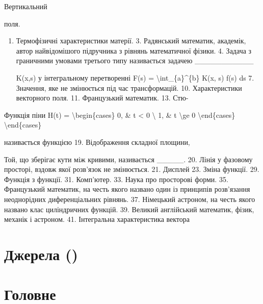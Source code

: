 \documentclass[
]{article}
\begin{document}
Вертикальний

поля.

\begin{enumerate}
\def\labelenumi{\arabic{enumi}.}
\setcounter{enumi}{1}
\item
  Термофізичні характеристики матерії. 3. Радянський математик,
  академік, автор найвідомішого підручника з рівнянь математичної
  фізики. 4. Задача з граничними умовами третього типу називається
  задачею \_\_\_\_\_\_\_\_\_\_\_

  K(x,s) у інтегральному перетворенні F(s) =
  \textbackslash int\_\{a\}\^{}\{b\} K(x, s) f(s) ds 7. Значення, яке не
  змінюється під час трансформацій. 10. Характеристики векторного поля.
  11. Французький математик. 13. Стю-
\end{enumerate}

Функція піни H(t) = \textbackslash begin\{cases\} 0, \& t \textless{} 0
\textbackslash{} 1, \& t \textbackslash ge 0 \textbackslash end\{cases\}
\textbackslash end\{cases\}

називається функцією 19. Відображення складної площини,

Той, що зберігає кути між кривими, називається \_\_\_\_\_. 20. Лінія у
фазовому просторі, вздовж якої розв'язок не змінюється. 21. Дисплей 23.
Зміна функції. 29. Функція з функції. 31. Комп'ютер. 33. Наука про
просторові форми. 35. Французький математик, на честь якого названо один
із принципів розв'язання неоднорідних диференціальних рівнянь. 37.
Німецький астроном, на честь якого названо клас циліндричних функцій.
39. Великий англійський математик, фізик, механік і астроном. 41.
Інтегральна характеристика вектора

\section{Джерела ()}\label{ux434ux436ux435ux440ux435ux43bux430}

\section{Головне}\label{ux433ux43eux43bux43eux432ux43dux435}
\end{document}

